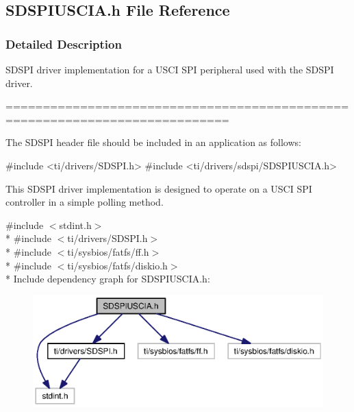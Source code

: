 \subsection{S\+D\+S\+P\+I\+U\+S\+C\+I\+A.\+h File Reference}
\label{_s_d_s_p_i_u_s_c_i_a_8h}


\subsubsection{Detailed Description}
S\+D\+S\+P\+I driver implementation for a U\+S\+C\+I S\+P\+I peripheral used with the S\+D\+S\+P\+I driver. 

============================================================================

The S\+D\+S\+P\+I header file should be included in an application as follows\+: 
\begin{DoxyCode}
\textcolor{preprocessor}{#include <ti/drivers/SDSPI.h>}
\textcolor{preprocessor}{#include <ti/drivers/sdspi/SDSPIUSCIA.h>}
\end{DoxyCode}


This S\+D\+S\+P\+I driver implementation is designed to operate on a U\+S\+C\+I S\+P\+I controller in a simple polling method. 

{\ttfamily \#include $<$stdint.\+h$>$}\\*
{\ttfamily \#include $<$ti/drivers/\+S\+D\+S\+P\+I.\+h$>$}\\*
{\ttfamily \#include $<$ti/sysbios/fatfs/ff.\+h$>$}\\*
{\ttfamily \#include $<$ti/sysbios/fatfs/diskio.\+h$>$}\\*
Include dependency graph for S\+D\+S\+P\+I\+U\+S\+C\+I\+A.\+h\+:
\nopagebreak
\begin{figure}[H]
\begin{center}
\leavevmode
\includegraphics[width=350pt]{_s_d_s_p_i_u_s_c_i_a_8h__incl}
\end{center}
\end{figure}
